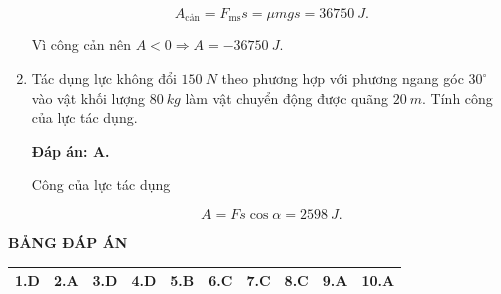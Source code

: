 \begin{enumerate}[label=\bfseries Câu \arabic*:]
{		$$A_\text{cản} = F_\text{ms}s = \mu mgs = \SI{36750}{J}.$$
		
		Vì công cản nên $A < 0 \Rightarrow A = - \SI{36750}{J}.$
	}
			\item {}
	
	
	{Tác dụng lực không đổi $\SI{150}{N}$ theo phương hợp với phương ngang góc $30^\circ$ vào vật khối lượng $\SI{80}{kg}$ làm vật chuyển động được quãng $\SI{20}{m}$. Tính công của lực tác dụng.
	}
	
	\hideall
	{	
		\textbf{Đáp án: A.}
		
		Công của lực tác dụng
		
		$$A=Fs\cos \alpha =\SI{2598}{J}.$$
	}
\end{enumerate}
\hideall
{
	\begin{center}
		\textbf{BẢNG ĐÁP ÁN}
	\end{center}
	\begin{center}
		\begin{tabular}{|m{2.8em}|m{2.8em}|m{2.8em}|m{2.8em}|m{2.8em}|m{2.8em}|m{2.8em}|m{2.8em}|m{2.8em}|m{2.8em}|}
			\hline
			1.D  & 2.A  & 3.D  & 4.D  & 5.B  & 6.C  & 7.C  & 8.C  & 9.A  & 10.A  \\
			\hline

		\end{tabular}
	\end{center}
}
